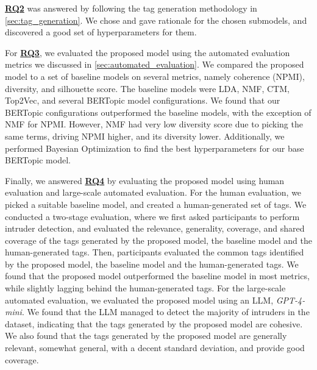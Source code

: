 \hyperref[rq2]{\textbf{RQ2}} was answered by following the tag generation methodology in \cref{sec:tag_generation}. We chose and gave rationale for the chosen submodels, and discovered a good set of hyperparameters for them.

For \hyperref[rq3]{\textbf{RQ3}}, we evaluated the proposed model using the automated evaluation metrics we discussed in \cref{sec:automated_evaluation}. We compared the proposed model to a set of baseline models on several metrics, namely coherence (NPMI), diversity, and silhouette score. The baseline models were LDA, NMF, CTM, Top2Vec, and several BERTopic model configurations. We found that our BERTopic configurations outperformed the baseline models, with the exception of NMF for NPMI. However, NMF had very low diversity score due to picking the same terms, driving NPMI higher, and its diversity lower. Additionally, we performed Bayesian Optimization to find the best hyperparameters for our base BERTopic model.

Finally, we answered \hyperref[rq4]{\textbf{RQ4}} by evaluating the proposed model using human evaluation and large-scale automated evaluation. For the human evaluation,  we picked a suitable baseline model, and created a human-generated set of tags. We conducted a two-stage evaluation, where we first asked participants to perform intruder detection, and evaluated the relevance, generality, coverage, and shared coverage of the tags generated by the proposed model, the baseline model and the human-generated tags. Then, participants evaluated the common tags identified by the proposed model, the baseline model and the human-generated tags. We found that the proposed model outperformed the baseline model in most metrics, while slightly lagging behind the human-generated tags. For the large-scale automated evaluation, we evaluated the proposed model using an LLM, \textit{GPT-4-mini}. We found that the LLM managed to detect the majority of intruders in the dataset, indicating that the tags generated by the proposed model are cohesive. We also found that the tags generated by the proposed model are generally relevant, somewhat general, with a decent standard deviation, and provide good coverage.
